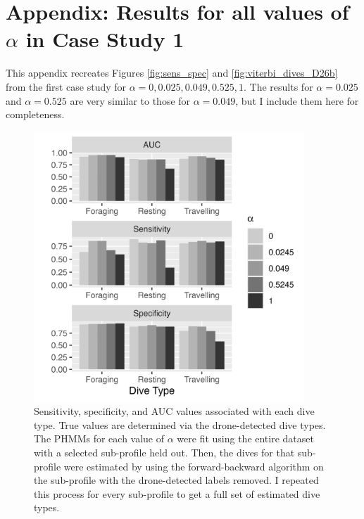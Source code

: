 \newpage

\section{Appendix: Results for all values of $\alpha$ in Case Study 1}

This appendix recreates Figures \ref{fig:sens_spec} and \ref{fig:viterbi_dives_D26b} from the first case study for $\alpha = 0,0.025,0.049,0.525,1$. The results for $\alpha = 0.025$ and $\alpha = 0.525$ are very similar to those for $\alpha = 0.049$, but I include them here for completeness.

\begin{figure}[H]
    \centering
    \includegraphics[width=4in]{plt/1-1-1-logMDDD_all_model_comparison_all_alphas.png}
    \caption{Sensitivity, specificity, and AUC values associated with each dive type. True values are determined via the drone-detected dive types. The PHMMs for each value of $\alpha$ were fit using the entire dataset with a selected sub-profile held out. Then, the dives for that sub-profile were estimated by using the forward-backward algorithm on the sub-profile with the drone-detected labels removed. I repeated this process for every sub-profile to get a full set of estimated dive types.}
    \label{fig:sens_spec_app}
\end{figure}

